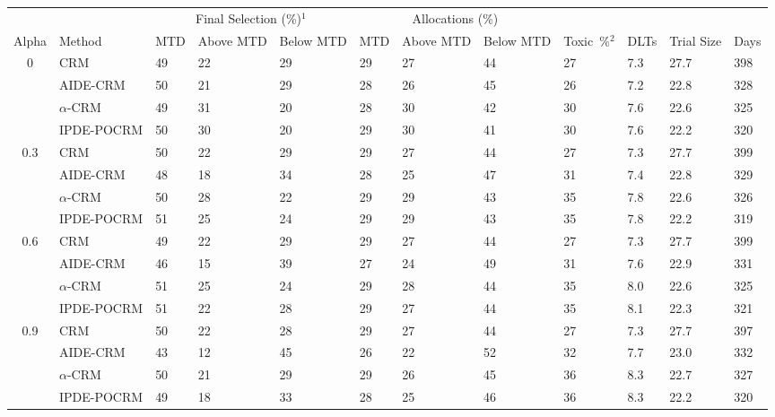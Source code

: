 \begin{tabular*}{\textwidth}{@{\extracolsep\fill}clllllllllll@{\extracolsep\fill}}
\toprule
&  & \multicolumn{3}{c}{Final Selection (\%)$^1$} & \multicolumn{3}{c}{Allocations (\%)} & &  &  &  \\
\multirow{2}{2em}{Alpha} & \multirow{2}{2em}{Method} & \multirow{2}{2em}{MTD} & \multirow{2}{2em}{Above MTD} & \multirow{2}{2em}{Below MTD} & \multirow{2}{2em}{MTD} & \multirow{2}{2em}{Above MTD} & \multirow{2}{2em}{Below MTD} & \multirow{2}{2em}{Toxic~\%$^2$} & \multirow{2}{2em}{DLTs} & \multirow{2}{2em}{Trial Size} & \multirow{2}{2em}{Days}  \\ \\ 
\midrule
\multirow{4}{2em}{0} & CRM & 49 & 22 & 29 & 29 & 27 & 44 & 27 & 7.3 & 27.7 & 398\\
 & AIDE-CRM & 50 & 21 & 29 & 28 & 26 & 45 & 26 & 7.2 & 22.8 & 328\\
 & $\alpha$-CRM & 49 & 31 & 20 & 28 & 30 & 42 & 30 & 7.6 & 22.6 & 325\\
 & IPDE-POCRM & 50 & 30 & 20 & 29 & 30 & 41 & 30 & 7.6 & 22.2 & 320\\
\midrule
\multirow{4}{2em}{0.3} & CRM & 50 & 22 & 29 & 29 & 27 & 44 & 27 & 7.3 & 27.7 & 399\\
 & AIDE-CRM & 48 & 18 & 34 & 28 & 25 & 47 & 31 & 7.4 & 22.8 & 329\\
 & $\alpha$-CRM & 50 & 28 & 22 & 29 & 29 & 43 & 35 & 7.8 & 22.6 & 326\\
 & IPDE-POCRM & 51 & 25 & 24 & 29 & 29 & 43 & 35 & 7.8 & 22.2 & 319\\
\midrule
\multirow{4}{2em}{0.6} & CRM & 49 & 22 & 29 & 29 & 27 & 44 & 27 & 7.3 & 27.7 & 399\\
 & AIDE-CRM & 46 & 15 & 39 & 27 & 24 & 49 & 31 & 7.6 & 22.9 & 331\\
 & $\alpha$-CRM & 51 & 25 & 24 & 29 & 28 & 44 & 35 & 8.0 & 22.6 & 325\\
 & IPDE-POCRM & 51 & 22 & 28 & 29 & 27 & 44 & 35 & 8.1 & 22.3 & 321\\
\midrule
\multirow{4}{2em}{0.9} & CRM & 50 & 22 & 28 & 29 & 27 & 44 & 27 & 7.3 & 27.7 & 397\\
 & AIDE-CRM & 43 & 12 & 45 & 26 & 22 & 52 & 32 & 7.7 & 23.0 & 332\\
 & $\alpha$-CRM & 50 & 21 & 29 & 29 & 26 & 45 & 36 & 8.3 & 22.7 & 327\\
 & IPDE-POCRM & 49 & 18 & 33 & 28 & 25 & 46 & 36 & 8.3 & 22.2 & 320\\
\bottomrule
\end{tabular*}
